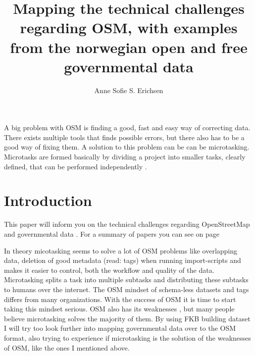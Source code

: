 \documentclass[12pt, a4paper]{report}   	%
\title{Mapping the  technical challenges regarding OSM, with examples from the norwegian open and free governmental data}
\author{Anne Sofie S. Erichsen}
\begin{document}


\setcounter{page}{1}


\abstract
A big problem with OSM is finding a good, fast and easy way of correcting data. There exists multiple tools that finds possible errors, but there also has to be a good way of fixing them. A solution to this problem can be can be microtasking. Microtasks are formed basically by dividing a project into smaller tasks, clearly defined, that can be performed independently \cite{EstellesArolas}.  

\chapter{Introduction}\label{sec:intro}
This paper will inform you on the technical challenges regarding OpenStreetMap and governmental data \cite{Exel2010}. For a summary of papers you can see on page \pageref{sec:wang}

In theory micotasking seems to solve a lot of OSM problems like overlapping data, deletion of good metadata (read: tags) when running import-scripts and makes it easier to control, both the workflow and quality of the data. Microtasking splits a task into multiple subtasks and distributing these subtasks to humans over the internet.  The OSM mindset  of schema-less datasets and tags differs from many organizations. With the success of OSM it is time to start taking this mindset serious. OSM also has its weaknesses , but many people believe microtasking solves the majority of them. By using FKB building dataset I will try too look further into mapping governmental data over to the OSM format, also trying to experience if microtasking is the solution of the weaknesses of OSM, like the ones I mentioned above. 











%




\end{document}

